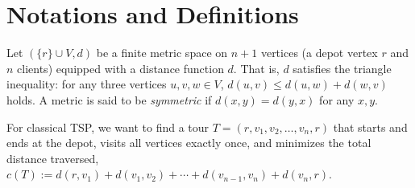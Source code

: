 \documentclass[12pt]{amsart}
\begin{document}
\section{Notations and Definitions}
Let $(\{r\}\cup V,d)$ be a finite metric space on $n+1$ vertices (a depot vertex $r$ and $n$ clients) equipped with a distance function $d$. 
That is, $d$ satisfies the triangle inequality: for any three vertices $u,v,w \in V$, $d(u,v) \leq d(u,w) + d(w,v)$ holds. 
A metric is said to be \emph{symmetric} if $d(x, y) = d(y, x)$ for any $x, y$.

For classical TSP, we want to find a tour $T = (r,v_1,v_2,\ldots,v_n,r)$ that starts and ends at the depot, visits all vertices exactly once, and minimizes the total distance traversed, $c(T) := d(r,v_1) + d(v_1,v_2) + \cdots + d(v_{n-1},v_n) + d(v_n,r)$. 
\end{document}
